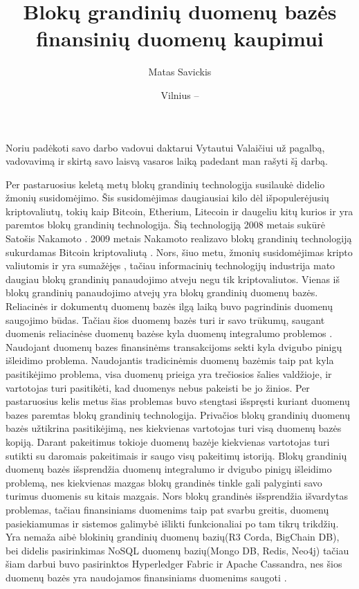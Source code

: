 \documentclass{VUMIFPSkursinis}
\title{Blokų grandinių duomenų bazės finansinių duomenų kaupimui}
\author{Matas Savickis}
\date{Vilnius – \the\year}
\begin{document}
\maketitle
\thispagestyle{empty} 

\tableofcontents

\setcounter{page}{3}
Noriu padėkoti savo darbo vadovui daktarui Vytautui Valaičiui už pagalbą, vadovavimą ir skirtą savo laisvą vasaros laiką padedant man rašyti šį darbą.


\thispagestyle{empty} 
Per pastaruosius keletą metų blokų grandinių technologija susilaukė didelio žmonių susidomėjimo. 
Šis susidomėjimas daugiausiai kilo dėl išpopulerėjusių kriptovaliutų, tokių kaip Bitcoin, Etherium, Litecoin ir daugeliu kitų 
kurios ir yra paremtos blokų grandinių technologija. Šią technologiją 2008 metais sukūrė Satošis Nakamoto \cite{BlockChain}. 
2009 metais Nakamoto realizavo blokų grandinių technologiją sukurdamas Bitcoin kriptovaliutą \cite{Bitcoin}. 
Nors, šiuo metu, žmonių susidomėjimas kripto valiutomis ir yra sumažėjęs \cite{Trends}, tačiau informacinių technologijų industrija 
mato daugiau blokų grandinių panaudojimo atveju negu tik kriptovaliutos. Vienas iš blokų grandinių panaudojimo atvejų yra 
blokų grandinių duomenų bazės. Reliacinės ir dokumentų duomenų bazės ilgą laiką buvo pagrindinis duomenų saugojimo būdas. 
Tačiau šios duomenų bazės turi ir savo trūkumų, saugant duomenis reliacinėse duomenų bazėse kyla duomenų integralumo problemos \cite{Integrity}. Naudojant duomenų bazes finansinėms transakcijoms sekti kyla dvigubo pinigų išleidimo problema\cite{Double}. Naudojantis tradicinėmis duomenų bazėmis 
taip pat kyla pasitikėjimo problema, visa duomenų prieiga yra trečiosios šalies valdžioje, ir vartotojas turi pasitikėti, kad duomenys nebus pakeisti be jo žinios.
Per pastaruosius kelis metus šias problemas
buvo stengtasi išspręsti kuriant duomenų bazes paremtas blokų grandinių technologija. Privačios blokų grandinių duomenų bazės užtikrina pasitikėjimą, nes kiekvienas vartotojas turi visą duomenų 
bazės kopiją. Darant pakeitimus tokioje duomenų bazėje kiekvienas vartotojas turi sutikti su daromais pakeitimais ir saugo visų pakeitimų istoriją. Blokų grandinių duomenų bazės išsprendžia duomenų integralumo ir
dvigubo pinigų išleidimo problemą, nes kiekvienas mazgas blokų grandinės tinkle gali palyginti savo turimus duomenis su kitais mazgais. 
Nors blokų grandinės išsprendžia išvardytas problemas, tačiau finansiniams duomenims taip pat svarbu greitis, duomenų pasiekiamumas ir sistemos galimybė išlikti funkcionaliai po tam tikrų trikdžių. 
Yra nemaža aibė blokinių grandinių duomenų bazių(R3 Corda, BigChain DB), bei didelis pasirinkimas NoSQL duomenų bazių(Mongo DB, Redis, Neo4j) tačiau šiam darbui buvo pasirinktos
Hyperledger Fabric ir Apache Cassandra, nes šios duomenų bazės yra naudojamos finansiniams duomenims saugoti \cite{BnkH,BnkC}.
\end{document}
